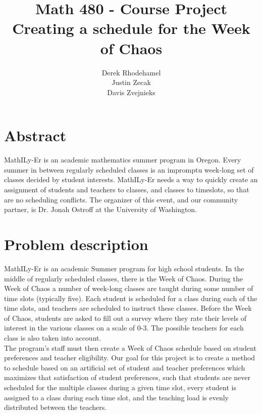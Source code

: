 \documentclass[11pt]{article}
\title{\textbf{Math 480 - Course Project}
			  \\Creating a schedule for the Week of Chaos}
\author{Derek Rhodehamel\\
		Justin Zecak\\
		Davis Zvejnieks}
\date{}
\begin{document}
\maketitle
\section{Abstract}
MathILy-Er is an academic mathematics summer program in Oregon. Every summer in between regularly scheduled classes is an impromptu week-long set of classes decided by student interests. MathILy-Er needs a way to quickly create an assignment of students and teachers to classes, and classes to timeslots, so that are no scheduling conflicts. The organizer of this event, and our community partner, is Dr. Jonah Ostroff at the University of Washington.
\section{Problem description}
MathILy-Er is an academic Summer program for high school students.  In the middle of regularly scheduled classes, there is the Week of Chaos.  During the Week of Chaos a number of week-long classes are taught during some number of time slots (typically five). Each student is scheduled for a class during each of the time slots, and teachers are scheduled to instruct these classes.  Before the Week of Chaos, students are asked to fill out a survey where they rate their levels of interest in the various classes on a scale of 0-3. The possible teachers for each class is also taken into account.\\
\indent The program's staff must then create a Week of Chaos schedule based on student preferences and teacher eligibility. Our goal for this project is to create a method to schedule based on an artificial set of student and teacher preferences which maximizes that satisfaction of student preferences, such that students are never scheduled for the multiple classes during a given time slot, every student is assigned to a class during each time slot, and the teaching load is evenly distributed between the teachers.
\end{document}
